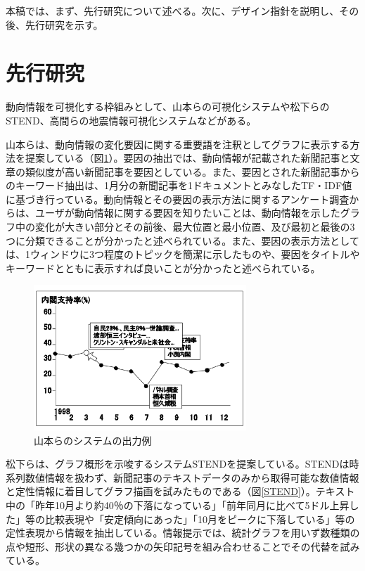\documentclass{matsushita-zemi}
\begin{document}
本稿では、まず、先行研究について述べる。次に、デザイン指針を説明し、その後、先行研究を示す。

\section{先行研究}
\label{relatedworks} 
動向情報を可視化する枠組みとして、山本らの可視化システム\cite{Tagged_corpus}や松下らのSTEND\cite{STEND}、高間らの地震情報可視化システム\cite{SpaceTrendInformation}などがある。

山本らは、動向情報の変化要因に関する重要語を注釈としてグラフに表示する方法を提案している（図\ref{system}）\cite{タグ付きコーパス}。要因の抽出では、動向情報が記載された新聞記事と文章の類似度が高い新聞記事を要因としている。また、要因とされた新聞記事からのキーワード抽出は、1月分の新聞記事を1ドキュメントとみなしたTF・IDF値に基づき行っている。動向情報とその要因の表示方法に関するアンケート調査からは、ユーザが動向情報に関する要因を知りたいことは、動向情報を示したグラフ中の変化が大きい部分とその前後、最大位置と最小位置、及び最初と最後の3つに分類できることが分かったと述べられている。また、要因の表示方法としては、1ウィンドウに3つ程度のトピックを簡潔に示したものや、要因をタイトルやキーワードとともに表示すれば良いことが分かったと述べられている。
\begin{figure}[tb]
  \begin{center}
   \includegraphics[width=8cm,bb=0 0 521 356]{tagu.PNG}
  \end{center}
 \caption{山本らのシステムの出力例}
 \label{system}
\end{figure}

松下らは、グラフ概形を示唆するシステムSTENDを提案している\cite{STEND}。STENDは時系列数値情報を扱わず、新聞記事のテキストデータのみから取得可能な数値情報と定性情報に着目してグラフ描画を試みたものである（図\ref{STEND}）。テキスト中の「昨年10月より約40％の下落になっている」「前年同月に比べて5ドル上昇した」等の比較表現や「安定傾向にあった」「10月をピークに下落している」等の定性表現から情報を抽出している。情報提示では、統計グラフを用いず数種類の点や短形、形状の異なる幾つかの矢印記号を組み合わせることでその代替を試みている。
\end{document}
